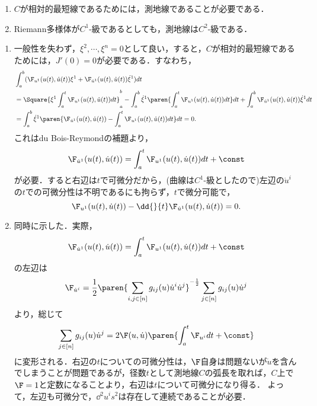 \documentclass[uplatex,dvipdfmx]{jsreport}
\begin{document}
\begin{proposition}\mbox{}
    \begin{enumerate}
        \item $C$が相対的最短線であるためには，測地線であることが必要である．
        \item Riemann多様体が$C^1$-級であるとしても，測地線は$C^2$-級である．
    \end{enumerate}
\end{proposition}
\begin{Proof}\mbox{}
    \begin{enumerate}
        \item 一般性を失わず，$\xi^2,\cdots,\xi^n=0$として良い，すると，$C$が相対的最短線であるためには，$J'(0)=0$が必要である．すなわち，
        \begin{align*}
            &\int^b_a(\F_{u^1}(u(t),\dot{u}(t))\xi^1+\F_{\dot{u}^1}(u(t),\dot{u}(t))\dot{\xi}^1)dt\\
            &=\Square{\xi^1\int^t_a\F_{u^1}(u(t),\dot{u}(t))dt}^b_a-\int^b_a\dot{\xi}^1\paren{\int^t_a\F_{u^1}(u(t),\dot{u}(t))dt}dt+\int^b_a\F_{\dot{u}^1}(u(t),\dot{u}(t))\dot{\xi}^1dt\\
            &=\int^b_a\dot{\xi}^1\paren{\F_{\dot{u}^1}(u(t),\dot{u}(t))-\int^t_a\F_{u^1}(u(t),\dot{u}(t))dt}dt=0.
        \end{align*}
        これはdu Bois-Reymondの補題より，
        \[\F_{\dot{u}^1}(u(t),\dot{u}(t))=\int^t_a\F_{u^1}(u(t),\dot{u}(t))dt+\const\]
        が必要．すると右辺は$t$で可微分だから，(曲線は$C^1$-級としたので)左辺の$\dot{u}^i$の$t$での可微分性は不明であるにも拘らず，$t$で微分可能で，
        \[\F_{u^1}(u(t),\dot{u}(t))-\dd{}{t}\F_{\dot{u}^1}(u(t),\dot{u}(t))=0.\]
        \item 同時に示した．実際，
        \[\F_{\dot{u}^1}(u(t),\dot{u}(t))=\int^t_a\F_{u^1}(u(t),\dot{u}(t))dt+\const\]
        の左辺は
        \[\F_{\dot{u}^i}=\frac{1}{2}\paren{\sum_{i,j\in[n]}g_{ij}(u)\dot{u}^i\dot{u}^j}^{-\frac{1}{2}}\sum_{j\in[n]}g_{ij}(u)\dot{u}^j\]
        より，総じて
        \[\sum_{j\in[n]}g_{ij}(u)\dot{u}^j=2\F(u,\dot{u})\paren{\int^t_a\F_{u^i}dt+\const}\]
        に変形される．右辺の$t$についての可微分性は，$\F$自身は問題ないが$\dot{u}$を含んでしまうことが問題であるが，径数$t$として測地線$C$の弧長を取れば，$C$上で$\F=1$と定数になることより，右辺は$t$について可微分になり得る．
        よって，左辺も可微分で，$\dd{^2u^i}{s^2}$は存在して連続であることが必要．
    \end{enumerate}
\end{Proof}
\end{document}
